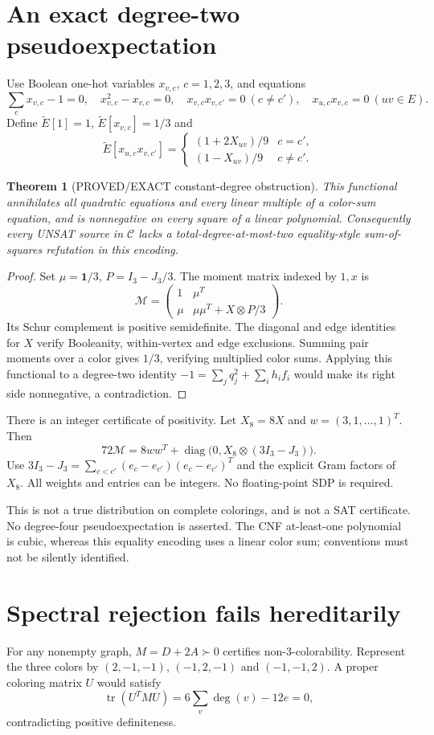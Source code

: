 \documentclass[11pt]{article}
\newtheorem{theorem}{Theorem}
\begin{document}
\section{An exact degree-two pseudoexpectation}
Use Boolean one-hot variables $x_{v,c}$, $c=1,2,3$, and equations
\[
\sum_c x_{v,c}-1=0,\quad x_{v,c}^2-x_{v,c}=0,\quad
x_{v,c}x_{v,c'}=0\ (c\ne c'),\quad
x_{u,c}x_{v,c}=0\ (uv\in E).
\]
Define $\widetilde E[1]=1$, $\widetilde E[x_{v,c}]=1/3$ and
\[
\widetilde E[x_{u,c}x_{v,c'}]=
\begin{cases}(1+2X_{uv})/9&c=c',\\(1-X_{uv})/9&c\ne c'.\end{cases}
\]
\begin{theorem}[PROVED/EXACT constant-degree obstruction]
This functional annihilates all quadratic equations and every linear multiple of a color-sum equation, and is nonnegative on every square of a linear polynomial. Consequently every UNSAT source in $\mathcal C$ lacks a total-degree-at-most-two equality-style sum-of-squares refutation in this encoding.
\end{theorem}
\begin{proof}
Set $\mu=\mathbf1/3$, $P=I_3-J_3/3$. The moment matrix indexed by $1,x$ is
\[
\mathcal M=\begin{pmatrix}1&\mu^T\\\mu&\mu\mu^T+X\otimes P/3\end{pmatrix}.
\]
Its Schur complement is positive semidefinite. The diagonal and edge identities for $X$ verify Booleanity, within-vertex and edge exclusions. Summing pair moments over a color gives $1/3$, verifying multiplied color sums. Applying this functional to a degree-two identity $-1=\sum_j q_j^2+\sum_i h_i f_i$ would make its right side nonnegative, a contradiction.
\end{proof}
There is an integer certificate of positivity. Let $X_8=8X$ and $w=(3,1,\ldots,1)^T$. Then
\[
72\mathcal M=8ww^T+\operatorname{diag}\bigl(0,X_8\otimes(3I_3-J_3)\bigr).
\]
Use $3I_3-J_3=\sum_{c<c'}(e_c-e_{c'})(e_c-e_{c'})^T$ and the explicit Gram factors of $X_8$. All weights and entries can be integers. No floating-point SDP is required.

This is not a true distribution on complete colorings, and is not a SAT certificate. No degree-four pseudoexpectation is asserted. The CNF at-least-one polynomial is cubic, whereas this equality encoding uses a linear color sum; conventions must not be silently identified.

\section{Spectral rejection fails hereditarily}
For any nonempty graph, $M=D+2A\succ0$ certifies non-3-colorability. Represent the three colors by $(2,-1,-1)$, $(-1,2,-1)$ and $(-1,-1,2)$. A proper coloring matrix $U$ would satisfy
\[
\operatorname{tr}(U^TMU)=6\sum_v\deg(v)-12e=0,
\]
contradicting positive definiteness.
\end{document}
